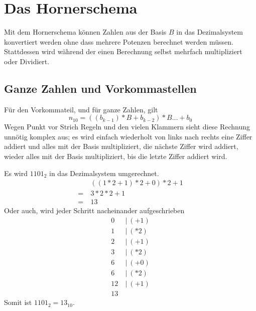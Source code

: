 \documentclass{article}
\begin{document}
\section{Das Hornerschema} 
Mit dem Hornerschema können Zahlen aus der Basis $B$ in das Dezimalsystem konvertiert werden ohne dass mehrere Potenzen berechnet werden müssen. Stattdessen wird während der einen Berechnung selbst mehrfach multipliziert oder Dividiert.

\subsection{Ganze Zahlen und Vorkommastellen}
Für den Vorkommateil, und für ganze Zahlen, gilt
\[
 n_{10} = ((b_{k-1}) * B + b_{k-2}) * B \dots + b_0
\]
Wegen Punkt vor Strich Regeln und den vielen Klammern sieht diese Rechnung unnötig komplex aus; es wird einfach wiederholt von links nach rechts eine Ziffer addiert und alles mit der Basis multipliziert, die nächste Ziffer wird addiert, wieder alles mit der Basis multipliziert, bis die letzte Ziffer addiert wird.
\begin{zexample}
Es wird $1101_2$ in das Dezimalsystem umgerechnet.
\begin{align*}
   &((1*2+1)*2+0)*2+1 \\
=\ &3*2*2+1 \\
=\ &13
\end{align*}
Oder auch, wird jeder Schritt nacheinander aufgeschrieben
\begin{align*}
 0\ &\vert\ (+1) \\
 1\ &\vert\ (*2) \\
 2\ &\vert\ (+1) \\
 3\ &\vert\ (*2) \\
 6\ &\vert\ (+0) \\
 6\ &\vert\ (*2) \\
 12\ &\vert\ (+1) \\
 13\ &
\end{align*}
Somit ist $1101_2 = 13_{10}$.
\end{zexample}
\end{document}

